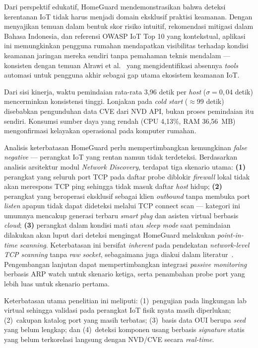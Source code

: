 \documentclass[conference]{IEEEtran}
\begin{document}
Dari perspektif edukatif, HomeGuard mendemonstrasikan bahwa deteksi
kerentanan IoT tidak harus menjadi domain eksklusif praktisi keamanan.
Dengan menyajikan temuan dalam bentuk skor risiko intuitif, rekomendasi
mitigasi dalam Bahasa Indonesia, dan referensi OWASP IoT Top 10 yang
kontekstual, aplikasi ini memungkinkan pengguna rumahan mendapatkan
visibilitas terhadap kondisi keamanan jaringan mereka sendiri tanpa
pemahaman teknis mendalam --- konsisten dengan temuan Alrawi
et al.\ \cite{alrawi2019} yang mengidentifikasi absennya \textit{tools}
automasi untuk pengguna akhir sebagai gap utama ekosistem keamanan IoT.

Dari sisi kinerja, waktu pemindaian rata-rata 3,96 detik per \textit{host}
($\sigma = 0{,}04$ detik) mencerminkan konsistensi tinggi. Lonjakan pada
\textit{cold start} ($\approx$99 detik) disebabkan pengunduhan data CVE
dari NVD API, bukan proses pemindaian itu sendiri. Konsumsi sumber daya
yang rendah (CPU 4,13\%, RAM 36,56~MB) mengonfirmasi kelayakan
operasional pada komputer rumahan.

Analisis keterbatasan HomeGuard perlu mempertimbangkan kemungkinan
\textit{false negative} --- perangkat IoT yang rentan namun tidak
terdeteksi. Berdasarkan analisis arsitektur modul \textit{Network
Discovery}, terdapat tiga skenario utama: \textbf{(1)} perangkat yang
seluruh port TCP pada daftar probe diblokir \textit{firewall} lokal tidak
akan merespons TCP ping sehingga tidak masuk daftar \textit{host} hidup;
\textbf{(2)} perangkat yang beroperasi eksklusif sebagai klien
\textit{outbound} tanpa membuka port \textit{listen} apapun tidak dapat
dideteksi melalui TCP connect scan --- kategori ini umumnya mencakup
generasi terbaru \textit{smart plug} dan asisten virtual berbasis
\textit{cloud}; \textbf{(3)} perangkat dalam kondisi mati atau
\textit{sleep mode} saat pemindaian dilakukan akan luput dari deteksi
mengingat HomeGuard melakukan \textit{point-in-time scanning}. Keterbatasan
ini bersifat \textit{inherent} pada pendekatan \textit{network-level TCP
scanning} tanpa \textit{raw socket}, sebagaimana juga diakui dalam
literatur~\cite{neshenko2019}. Pengembangan lanjutan dapat
mempertimbangkan integrasi \textit{passive monitoring} berbasis ARP watch
untuk skenario ketiga, serta penambahan probe port yang lebih luas untuk
skenario pertama.

Keterbatasan utama penelitian ini meliputi: (1)~pengujian pada lingkungan
lab virtual sehingga validasi pada perangkat IoT fisik nyata masih
diperlukan; (2)~cakupan katalog port yang masih terbatas; (3)~basis data
OUI berupa \textit{seed} yang belum lengkap; dan (4)~deteksi komponen
usang berbasis \textit{signature} statis yang belum terkorelasi langsung
dengan NVD/CVE secara \textit{real-time}.
\end{document}
